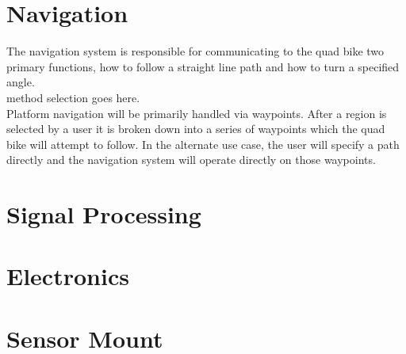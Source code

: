 \documentclass[main.tex]{subfiles}
\begin{document}
\section{Navigation}
The navigation system is responsible for communicating to the quad bike two primary functions, how to follow a straight line path and how to turn a specified angle.
\\
method selection goes here.
\\
Platform navigation will be primarily handled via waypoints. After a region is selected by a user it is broken down into a series of waypoints which the quad bike will attempt to follow. In the alternate use case, the user will specify a path directly and the navigation system will operate directly on those waypoints.

\section{Signal Processing}

\section{Electronics}

\section{Sensor Mount}
\end{document}
